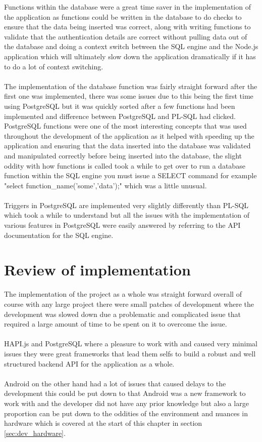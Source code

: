 Functions within the database were a great time saver in the implementation of the application as functions could be written in the database to do checks to ensure that the data being inserted was correct, along with writing functions to validate that the authentication details are correct without pulling data out of the database and doing a context switch between the SQL engine and the Node.js application which will ultimately slow down the application dramatically if it has to do a lot of context switching.\\
\\
The implementation of the database function was fairly straight forward after the first one was implemented, there was some issues due to this being the first time using PostgreSQL but it was quickly sorted after a few functions had been implemented and difference between PostgreSQL and PL-SQL had clicked. PostgreSQL functions were one of the most interesting concepts that was used throughout the development of the application as it helped with speeding up the application and ensuring that the data inserted into the database was validated and manipulated correctly before being inserted into the database, the slight oddity with how functions is called took a while to get over to run a database function within the SQL engine you must issue a SELECT command for example "select function\_name('some','data');" which was a little unusual.\\
\\
Triggers in PostgreSQL are implemented very slightly differently than PL-SQL which took a while to understand but all the issues with the implementation of various features in PostgreSQL were easily answered by referring to the API documentation \cite{Postgres:APIDocumentation:2015:online} for the SQL engine.

\section{Review of implementation}

The implementation of the project as a whole was straight forward overall of course with any large project there were small patches of development where the development was slowed down due a problematic and complicated issue that required a large amount of time to be spent on it to overcome the issue.\\
\\
HAPI.js and PostgreSQL where a pleasure to work with and caused very minimal issues they were great frameworks that lead them selfs to build a robust and well structured backend API for the application as a whole.\\
\\
Android on the other hand had a lot of issues that caused delays to the development this could be put down to that Android was a new framework to work with and the developer did not have any prior knowledge but also a large proportion can be put down to the oddities of the environment and nuances in hardware which is covered at the start of this chapter in section \ref{sec:dev_hardware}.
